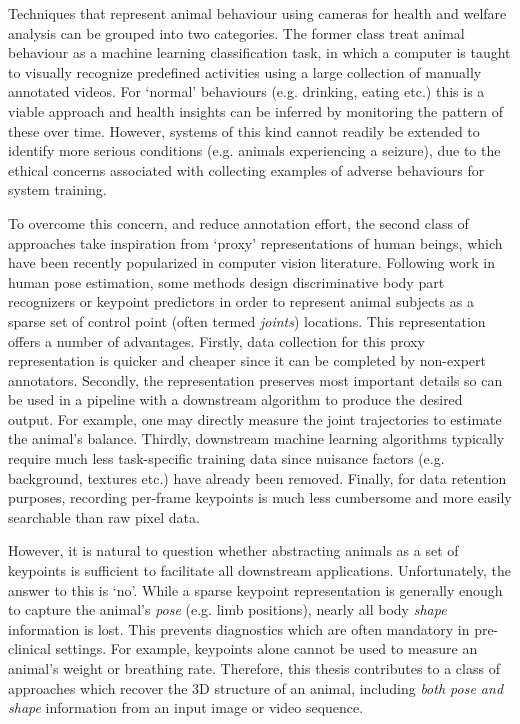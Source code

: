 Techniques that represent animal behaviour using cameras for health and welfare analysis can be grouped into two categories. The former class treat animal behaviour as a machine learning classification task, in which a computer is taught to visually recognize predefined activities using a large collection of manually annotated videos. For `normal' behaviours (e.g. drinking, eating etc.) this is a viable approach and health insights can be inferred by monitoring the pattern of these over time. However, systems of this kind cannot readily be extended to identify more serious conditions (e.g. animals experiencing a seizure), due to the ethical concerns associated with collecting examples of adverse behaviours for system training. 

To overcome this concern, and reduce annotation effort, the second class of approaches take inspiration from `proxy' representations of human beings, which have been recently popularized in computer vision literature. Following work in human pose estimation, some methods design discriminative body part recognizers or keypoint predictors in order to represent animal subjects as a sparse set of control point (often termed \emph{joints}) locations. This representation offers a number of advantages. Firstly, data collection for this proxy representation is quicker and cheaper since it can be completed by non-expert annotators. Secondly, the representation preserves most important details so can be used in a pipeline with a downstream algorithm to produce the desired output. For example, one may directly measure the joint trajectories to estimate the animal's balance. Thirdly, downstream machine learning algorithms typically require much less task-specific training data since nuisance factors (e.g. background, textures etc.) have already been removed. Finally, for data retention purposes, recording per-frame keypoints is much less cumbersome and more easily searchable than raw pixel data.

However, it is natural to question whether abstracting animals as a set of keypoints is sufficient to facilitate all downstream applications. Unfortunately, the answer to this is `no'. While a sparse keypoint representation is generally enough to capture the animal's \emph{pose} (e.g. limb positions), nearly all body \emph{shape} information is lost. This prevents diagnostics which are often mandatory in pre-clinical settings. For example, keypoints alone cannot be used to measure an animal's weight or breathing rate. Therefore, this thesis contributes to a class of approaches which recover the 3D structure of an animal, including \emph{both pose and shape} information from an input image or video sequence.

